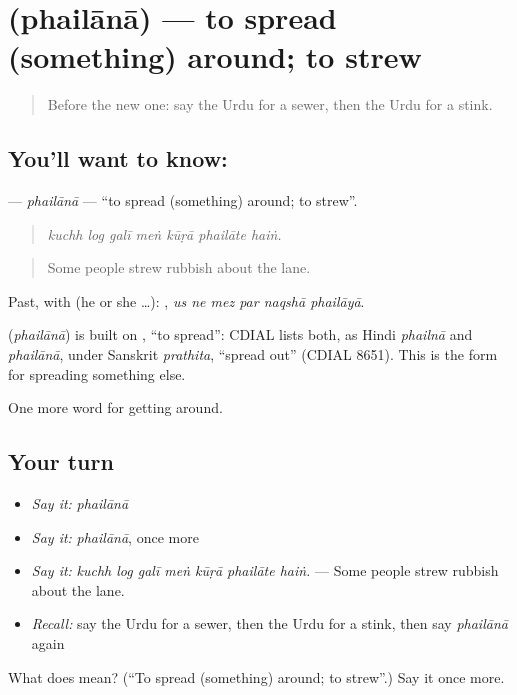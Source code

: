 \section[\texorpdfstring{\ur{پھیلانا} (phailānā)}{پھیلانا (phailānā)}]{ (phailānā) — to spread (something) around; to strew}

\label{lesson:UR-C416-phailana}



\begin{quote}
Before the new one: say the Urdu for a sewer, then the Urdu for a stink.
\end{quote}

\subsection*{You'll want to know: }
\textbf{} — \emph{phailānā} — \textquotedblleft{}to spread (something) around; to strew\textquotedblright{}.

\begin{quote}
      
\end{quote}

\begin{quote}
\emph{kuchh log galī meṅ kūṛā phailāte haiṅ.}
\end{quote}

\begin{quote}
Some people strew rubbish about the lane.
\end{quote}

Past, with  (he or she …):      , \emph{us ne mez par naqshā phailāyā}.

\begin{cousinweb}
\textbf{} (\emph{phailānā}) is built on \textbf{}, \textquotedblleft{}to spread\textquotedblright{}: CDIAL lists both, as Hindi \emph{phailnā} and \emph{phailānā}, under Sanskrit \emph{prathita}, \textquotedblleft{}spread out\textquotedblright{} (CDIAL 8651). This is the form for spreading something else.
\end{cousinweb}

\begin{grammarlens}[title={What you've built}]
One more word for getting around.
\end{grammarlens}

\subsection*{Your turn}
\begin{itemize}
\raggedright
  \item \emph{Say it:} \emph{phailānā}
  \item \emph{Say it:} \emph{phailānā}, once more
  \item \emph{Say it:} \emph{kuchh log galī meṅ kūṛā phailāte haiṅ.} — Some people strew rubbish about the lane.
  \item \emph{Recall:} say the Urdu for a sewer, then the Urdu for a stink, then say \emph{phailānā} again
\end{itemize}

\begin{tcolorbox}[breakable,colback=teal!4,colframe=teal!35!black,title={Before you move on}]
What does  mean? (\textquotedblleft{}To spread (something) around; to strew\textquotedblright{}.) Say it once more.
\end{tcolorbox}
